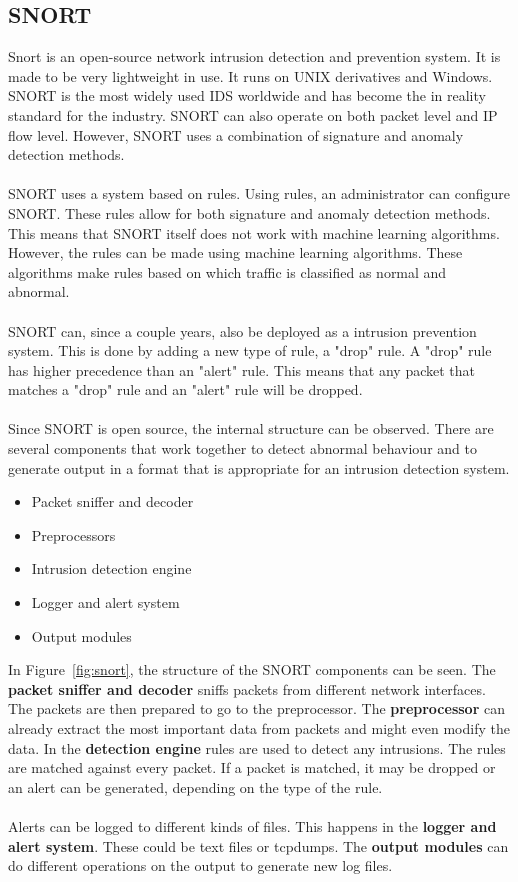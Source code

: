 \subsection{SNORT}
Snort is an open-source network intrusion detection and prevention system. It is made to be very lightweight in use. It runs on UNIX derivatives and Windows. SNORT is the most widely used IDS worldwide and has become the in reality standard for the industry. SNORT can also operate on both packet level and IP flow level. However, SNORT uses a combination of signature and anomaly detection methods. \cite{kurundkar2012network} \\
\\
SNORT uses a system based on rules. Using rules, an administrator can configure SNORT. These rules allow for both signature and anomaly detection methods. This means that SNORT itself does not work with machine learning algorithms. However, the rules can be made using machine learning algorithms. These algorithms make rules based on which traffic is classified as normal and abnormal.  \cite{duffield2009rule} \\
\\
SNORT can, since a couple years, also be deployed as a intrusion prevention system. This is done by adding a new type of rule, a "drop" rule. A "drop" rule has higher precedence than an "alert" rule. This means that any packet that matches a "drop" rule and an "alert" rule will be dropped. \\
\\
Since SNORT is open source, the internal structure can be observed. There are several components that work together to detect abnormal behaviour and to generate output in a format that is appropriate for an intrusion detection system. \cite{kurundkar2012network}
\begin{itemize}
\item Packet sniffer and decoder
\item Preprocessors
\item Intrusion detection engine
\item Logger and alert system
\item Output modules
\end{itemize}

\noindent In Figure~\ref{fig:snort}, the structure of the SNORT components can be seen. The \textbf{packet sniffer and decoder} sniffs packets from different network interfaces. The packets are then prepared to go to the preprocessor. The \textbf{preprocessor} can already extract the most important data from packets and might even modify the data. In the \textbf{detection engine} rules are used to detect any intrusions. The rules are matched against every packet. If a packet is matched, it may be dropped or an alert can be generated, depending on the type of the rule. \\
\\
Alerts can be logged to different kinds of files. This happens in the \textbf{logger and alert system}. These could be text files or tcpdumps. The \textbf{output modules} can do different operations on the output to generate new log files.  \cite{kurundkar2012network}

